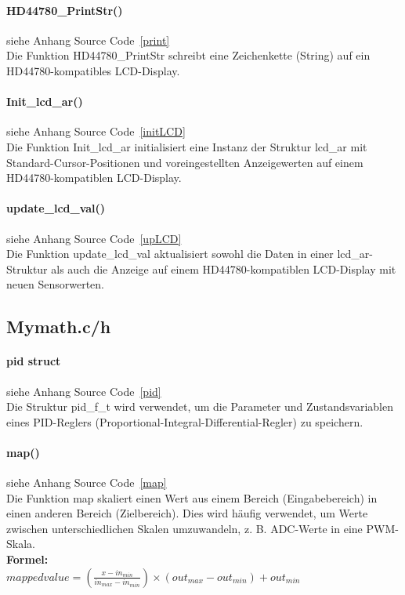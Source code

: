 \documentclass[paper=a4,11pt]{scrreprt}
\begin{document}
\paragraph{\textbf{HD44780\_PrintStr()}} siehe Anhang Source Code~\ref{print}\\
Die Funktion HD44780\_PrintStr schreibt eine Zeichenkette (String) auf ein HD44780-kompatibles LCD-Display.
\paragraph{\textbf{Init\_lcd\_ar()}} siehe Anhang Source Code~\ref{initLCD}\\
Die Funktion Init\_lcd\_ar initialisiert eine Instanz der Struktur lcd\_ar mit Standard-Cursor-Positionen und voreingestellten Anzeigewerten auf einem HD44780-kompatiblen LCD-Display.
\paragraph{\textbf{update\_lcd\_val()}} siehe Anhang Source Code~\ref{upLCD}\\
Die Funktion update\_lcd\_val aktualisiert sowohl die Daten in einer lcd\_ar-Struktur als auch die Anzeige auf einem HD44780-kompatiblen LCD-Display mit neuen Sensorwerten.
\subsection{Mymath.c/h}
\paragraph{\textbf{pid struct}} siehe Anhang Source Code~\ref{pid}\\
Die Struktur pid\_f\_t wird verwendet, um die Parameter und Zustandsvariablen eines PID-Reglers (Proportional-Integral-Differential-Regler) zu speichern.\\
\paragraph{\textbf{map()}} siehe Anhang Source Code~\ref{map}\\
Die Funktion map skaliert einen Wert aus einem Bereich (Eingabebereich) in einen anderen Bereich (Zielbereich). Dies wird häufig verwendet, um Werte zwischen unterschiedlichen Skalen umzuwandeln, z. B. ADC-Werte in eine PWM-Skala.\\
\textbf{Formel:}\\ $mapped value = (\frac{x-in_{ min }}{in_{ max }-in_{ min }  })\times (out_{ max }-out_{ min })+out_{ min }$
\end{document}
